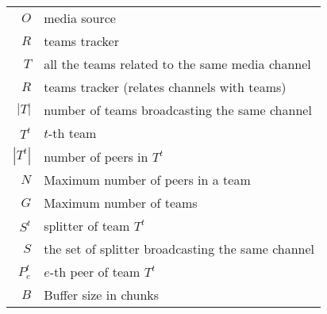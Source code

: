 \begin{tabular}{rl}
  $O$     & media source \\
  $R$     & teams tracker \\
  $T$     & all the teams related to the same media channel \\
  $R$     & teams tracker (relates channels with teams)\\
  $|T|$   & number of teams broadcasting the same channel \\
  $T^t$   & $t$-th team \\
  $|T^t|$ & number of peers in $T^t$ \\
  $N$     & Maximum number of peers in a team \\
  $G$     & Maximum number of teams \\
  $S^t$   & splitter of team $T^t$ \\
  $S$     & the set of splitter broadcasting the same channel \\
  $P^t_e$ & $e$-th peer of team $T^t$ \\
  $B$     & Buffer size in chunks \\
\end{tabular}
